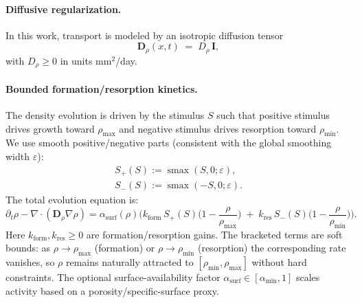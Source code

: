 \paragraph{Diffusive regularization.}
In this work, transport is modeled by an isotropic diffusion tensor
\begin{equation}\label{eq:Drho-nd}
\mathbf{D}_\rho(x,t) \;=\; D_\rho\,\mathbf{I},
\end{equation}
with $D_\rho\ge 0$ in units mm$^2$/day.

\paragraph{Bounded formation/resorption kinetics.}
The density evolution is driven by the stimulus $S$ such that positive stimulus drives growth toward $\rho_{\max}$ and negative stimulus drives resorption toward $\rho_{\min}$. We use smooth positive/negative parts (consistent with the global smoothing width $\varepsilon$):
\begin{align}\label{eq:smooth-splits-nd}
S_+(S):=\operatorname{smax}(S,0;\varepsilon),\\
S_-(S):=\operatorname{smax}(-S,0;\varepsilon).
\end{align}
The total evolution equation is:
\begin{equation}\label{eq:density-strong-nd}
\partial_t \rho - \nabla \cdot (\mathbf{D}_\rho \nabla \rho) =
\alpha_{\mathrm{surf}}(\rho)\Big(
k_{\mathrm{form}}\,S_+(S)\Big(1-\frac{\rho}{\rho_{\max}}\Big)
\;+\;k_{\mathrm{res}}\,S_-(S)\Big(1-\frac{\rho}{\rho_{\min}}\Big)
\Big).
\end{equation}
Here $k_{\mathrm{form}},k_{\mathrm{res}}\ge 0$ are formation/resorption gains. The bracketed terms are soft bounds: as $\rho\to\rho_{\max}$ (formation) or $\rho\to\rho_{\min}$ (resorption) the corresponding rate vanishes, so $\rho$ remains naturally attracted to $[\rho_{\min},\rho_{\max}]$ without hard constraints. The optional surface-availability factor $\alpha_{\mathrm{surf}}\in[\alpha_{\min},1]$ scales activity based on a porosity/specific-surface proxy.


